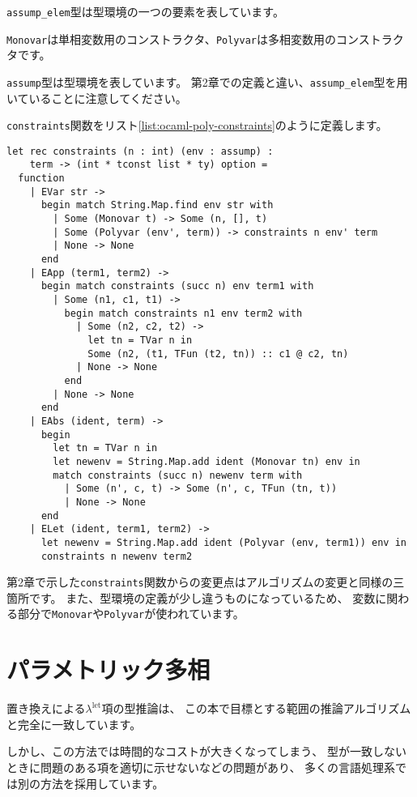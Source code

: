 \texttt{assump\_elem}型は型環境の一つの要素を表しています。

\texttt{Monovar}は単相変数用のコンストラクタ、\texttt{Polyvar}は多相変数用のコンストラクタです。

\texttt{assump}型は型環境を表しています。
第2章での定義と違い、\texttt{assump\_elem}型を用いていることに注意してください。

\texttt{constraints}関数をリスト\ref{list:ocaml-poly-constraints}のように定義します。

\begin{lstlisting}[caption=制約の生成, label=list:ocaml-poly-constraints]
let rec constraints (n : int) (env : assump) :
    term -> (int * tconst list * ty) option =
  function
    | EVar str ->
      begin match String.Map.find env str with
        | Some (Monovar t) -> Some (n, [], t)
        | Some (Polyvar (env', term)) -> constraints n env' term
        | None -> None
      end
    | EApp (term1, term2) ->
      begin match constraints (succ n) env term1 with
        | Some (n1, c1, t1) ->
          begin match constraints n1 env term2 with
            | Some (n2, c2, t2) ->
              let tn = TVar n in
              Some (n2, (t1, TFun (t2, tn)) :: c1 @ c2, tn)
            | None -> None
          end
        | None -> None
      end
    | EAbs (ident, term) ->
      begin
        let tn = TVar n in
        let newenv = String.Map.add ident (Monovar tn) env in
        match constraints (succ n) newenv term with
          | Some (n', c, t) -> Some (n', c, TFun (tn, t))
          | None -> None
      end
    | ELet (ident, term1, term2) ->
      let newenv = String.Map.add ident (Polyvar (env, term1)) env in
      constraints n newenv term2
\end{lstlisting}

第2章で示した\texttt{constraints}関数からの変更点はアルゴリズムの変更と同様の三箇所です。
また、型環境の定義が少し違うものになっているため、
変数に関わる部分で\texttt{Monovar}や\texttt{Polyvar}が使われています。

\section{パラメトリック多相}

置き換えによる$\lambda^\mathrm{let}$項の型推論は、
この本で目標とする範囲の推論アルゴリズムと完全に一致しています。

しかし、この方法では時間的なコストが大きくなってしまう、
型が一致しないときに問題のある項を適切に示せないなどの問題があり、
多くの言語処理系では別の方法を採用しています。

